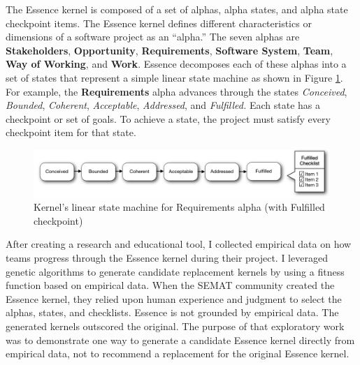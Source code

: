 \documentclass[preprint,12pt,3p]{elsarticle}
\begin{document}
The Essence kernel is composed of a set of alphas, alpha states, and alpha state checkpoint items. The Essence kernel defines different characteristics or dimensions of a software project as an ``alpha.'' The seven alphas are \textbf{Stakeholders}, \textbf{Opportunity}, \textbf{Requirements}, \textbf{Software System}, \textbf{Team}, \textbf{Way of Working}, and \textbf{Work}. Essence decomposes each of these alphas into a set of states that represent a simple linear state machine as shown in Figure \ref{StateMachine}. For example, the \textbf{Requirements} alpha advances through the states \textit{Conceived}, \textit{Bounded}, \textit{Coherent}, \textit{Acceptable}, \textit{Addressed}, and \textit{Fulfilled.} Each state has a checkpoint or set of goals. To achieve a state, the project must satisfy every checkpoint item for that state. \cite{OMGStandard} 
 
\begin{figure}[h]\vspace*{4pt}
\centerline{\includegraphics[width=5.4in]{kernel_images/StateMachineRequirements}}
\caption{Kernel's linear state machine for Requirements alpha (with Fulfilled checkpoint)}\vspace*{-6pt}\label{StateMachine}
\end{figure}


After creating a research and educational tool, I collected empirical data on how teams progress through the Essence kernel during their project. I leveraged genetic algorithms to generate candidate replacement kernels by using a fitness function based on empirical data. When the SEMAT community created the Essence kernel, they relied upon human experience and judgment to select the alphas, states, and checklists. Essence is not grounded by empirical data. The generated kernels outscored the original. The purpose of that exploratory work was to demonstrate one way to generate a candidate Essence kernel directly from empirical data, not to recommend a replacement for the original Essence kernel. \cite{SCSE2015}
\end{document}
